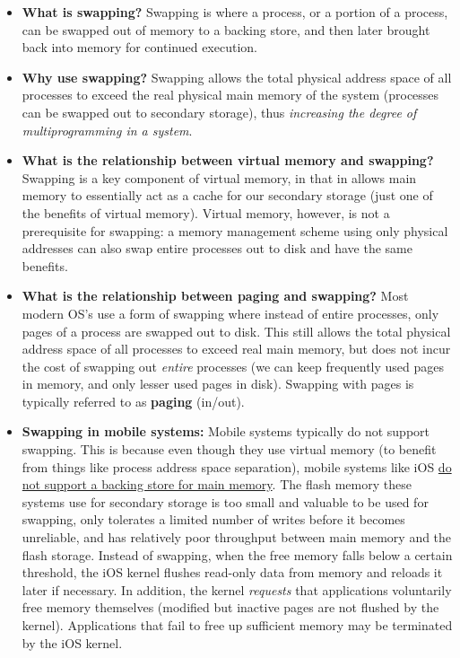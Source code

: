 \documentclass[12pt]{article}
\begin{document}
\begin{itemize}
    \item \textbf{What is swapping?} Swapping is where a process, or a portion of a process, can be swapped out of memory to a backing store, and then later brought back into memory for continued execution.
    \item \textbf{Why use swapping?} Swapping allows the total physical address space of all processes to exceed the real physical main memory of the system (processes can be swapped out to secondary storage), thus \textit{increasing the degree of multiprogramming in a system}.
    \item \textbf{What is the relationship between virtual memory and swapping?} Swapping is a key component of virtual memory, in that in allows main memory to essentially act as a cache for our secondary storage (just one of the benefits of virtual memory). Virtual memory, however, is not a prerequisite for swapping: a memory management scheme using only physical addresses can also swap entire processes out to disk and have the same benefits.
    \item \textbf{What is the relationship between paging and swapping?} Most modern OS's use a form of swapping where instead of entire processes, only pages of a process are swapped out to disk. This still allows the total physical address space of all processes to exceed real main memory, but does not incur the cost of swapping out \textit{entire} processes (we can keep frequently used pages in memory, and only lesser used pages in disk). Swapping with pages is typically referred to as \textbf{paging} (in/out).
    \item \textbf{Swapping in mobile systems:} Mobile systems typically do not support swapping. This is because even though they use virtual memory (to benefit from things like process address space separation), mobile systems like iOS \href{https://developer.apple.com/library/archive/documentation/Performance/Conceptual/ManagingMemory/Articles/AboutMemory.html}{do not support a backing store for main memory}. The flash memory these systems use for secondary storage is too small and valuable to be used for swapping, only tolerates a limited number of writes before it becomes unreliable, and has relatively poor throughput between main memory and the flash storage. Instead of swapping, when the free memory falls below a certain threshold, the iOS kernel flushes read-only data from memory and reloads it later if necessary. In addition, the kernel \textit{requests} that applications voluntarily free memory themselves (modified but inactive pages are not flushed by the kernel). Applications that fail to free up sufficient memory may be terminated by the iOS kernel.

\end{itemize}
\end{document}
